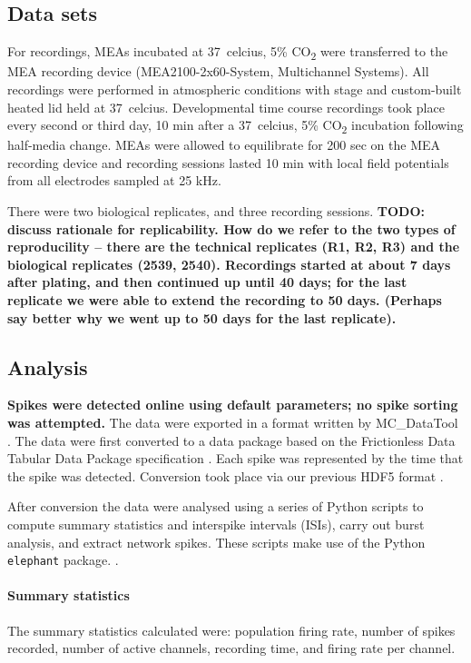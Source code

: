 \documentclass[doublespacing]{bmcart}
\begin{document}
\subsection*{Data sets}
For recordings, MEAs incubated at \SI{37}{celcius}, 5\%
CO\textsubscript{2} were transferred to the MEA recording device
(MEA2100-2x60-System, Multichannel Systems). All recordings were
performed in atmospheric conditions with stage and custom-built heated
lid held at \SI{37}{celcius}. Developmental time course recordings took
place every second or third day, 10 min after a \SI{37}{celcius}, 5\%
CO\textsubscript{2} incubation following half-media change. MEAs were
allowed to equilibrate for 200 sec on the MEA recording device and
recording sessions lasted 10 min with local field potentials from all
electrodes sampled at 25 kHz.

\par There were two biological replicates, and three recording
sessions.  \textbf{TODO: discuss rationale for replicability.  How do we refer to the two types of reproducility -- there are the technical replicates (R1, R2, R3) and the biological replicates (2539, 2540).  Recordings started at about 7 days after plating, and then continued up until 40 days; for the last replicate we were able to extend the recording to 50 days.  (Perhaps say better why we went up to 50 days for the last replicate).}

\subsection*{Analysis}

\par \textbf{Spikes were detected online using default parameters; no
  spike sorting was attempted.}  The data were exported in a format written by MC\_DataTool \cite{Systems2014-tw}. The data were first converted to a data package based on the Frictionless Data Tabular Data Package specification \cite{Walsh2017-nm}. Each spike was represented by the time that the spike was detected. Conversion took place via our previous HDF5 format \cite{Eglen2014}.

\par After conversion the data were analysed using a series of Python
scripts to compute summary statistics and interspike intervals (ISIs),
carry out burst analysis, and extract network spikes. These scripts
make use of the Python \texttt{elephant} package.
\cite{elephant_toolkit}.

\paragraph{Summary statistics} The summary statistics calculated were: population firing rate, number of spikes recorded, number of active channels, recording time, and firing rate per channel.
\end{document}
